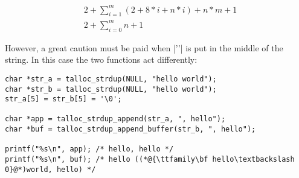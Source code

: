 \begin{align}
&2 + \sum_{i=1}^m (2 + 8*i + n*i) + n*m + 1 \label{eq:append} \\
&2 + \sum_{i=0}^m n + 1 \label{eq:buffer}
\end{align}

\noindent
However, a great caution must be paid when |'\0'| is put in the middle of the
string. In this case the two functions act differently:

\begin{lstlisting}[caption={Zero in the middle of a string}]
char *str_a = talloc_strdup(NULL, "hello world");
char *str_b = talloc_strdup(NULL, "hello world");
str_a[5] = str_b[5] = '\0';

char *app = talloc_strdup_append(str_a, ", hello");
char *buf = talloc_strdup_append_buffer(str_b, ", hello");

printf("%s\n", app); /* hello, hello */
printf("%s\n", buf); /* hello ((*@{\ttfamily\bf hello\textbackslash 0}@*)world, hello) */
\end{lstlisting}
